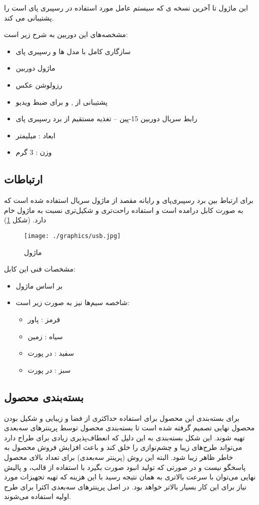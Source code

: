 \documentclass{article}
\begin{document}
این ماژول تا آخرین نسخه ی  که سیستم عامل مورد استفاده در رسپبری پای است را پشتیبانی می کند.

مشخصه‌های این دوربین به شرح زیر است:
\begin{itemize}
	\item سازگاری کامل با مدل ها  و  رسپبری پای
	\item ماژول دوربین 
	\item رزولوشن عکس 
	\item پشتیبانی از  ,  و   برای ضبط ویدیو
	\item رابط سریال دوربین 15-پین   – تغذیه مستقیم از برد رسپبری پای
	\item ابعاد :   میلیمتر
	\item وزن : 3 گرم
\end{itemize}		

\subsection{ارتباطات}
برای ارتباط بین برد رسپبری‌پای و رایانه مقصد از ماژول سریال  استفاده
شده است که به صورت کابل درامده است و استفاده راحت‌تری و شکیل‌تری نسبت به ماژول خام دارد.
(شکل \ref{usb})

\begin{figure}
	\centering
	\texttt{[image: ./graphics/usb.jpg]}
	\caption{ماژول }
	\label{usb}
\end{figure}

 مشخصات فنی این کابل:
 \begin{itemize}
 	\item بر اساس ماژول 
 	\item شاخصه‌ سیم‌ها نیز به صورت زیر است:
 	\begin{itemize}[*]
 		\item قرمز : پاور
 		\item سیاه : زمین
 		\item سفید :  در پورت 
 		\item سبز :   در پورت 
 	\end{itemize}
 \end{itemize}

\subsection{بسته‌بندی محصول}
برای بسته‌بندی این محصول برای استفاده حداکثری از فضا و زیبایی و شکیل بودن محصول نهایی تصمیم
گرفته شده است تا بسته‌بندی محصول توسط پرینترهای سه‌بعدی تهیه شوند. این شکل بسته‌بندی به این دلیل که انعطاف‌پذیری زیادی برای طراح دارد می‌تواند طرح‌های زیبا و چشم‌نوازی را خلق کند و باعث
افزایش فروش محصول به خاطر ظاهر زیبا شود. البته این روش (پرینتر سه‌بعدی) برای تعداد بالای
محصول پاسخگو نیست و در صورتی که تولید انبود صورت بگیرد با استفاده از قالب، و پالیش نهایی
می‌توان با سرعت بالاتری به همان نتیجه رسید با این هزینه که تهیه تجهیزات مورد نیاز برای این
کار بسیار بالاتر خواهد بود. در اصل پرینترهای سه‌بعدی اکثرا برای طرح اولیه استفاده می‌شوند.
\end{document}
